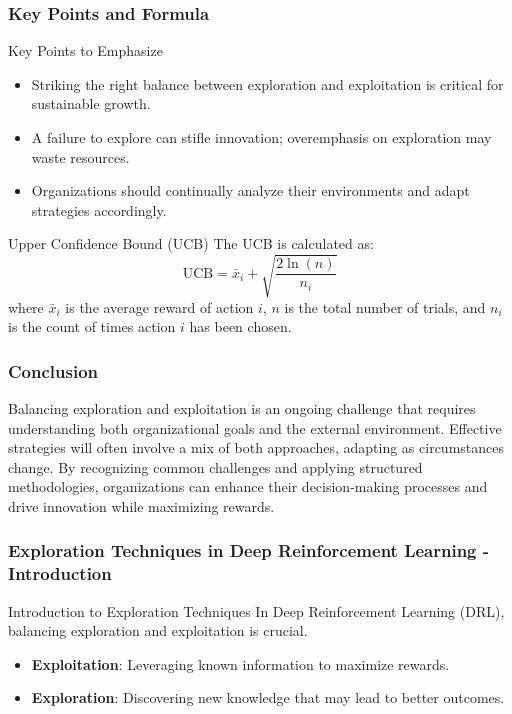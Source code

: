 \documentclass[aspectratio=169]{beamer}
\begin{document}
\begin{frame}[fragile]
    \frametitle{Key Points and Formula}
    \begin{block}{Key Points to Emphasize}
        \begin{itemize}
            \item Striking the right balance between exploration and exploitation is critical for sustainable growth.
            \item A failure to explore can stifle innovation; overemphasis on exploration may waste resources.
            \item Organizations should continually analyze their environments and adapt strategies accordingly.
        \end{itemize}
    \end{block}
    
    \begin{block}{Upper Confidence Bound (UCB)}
        The UCB is calculated as:
        \begin{equation}
            \text{UCB} = \bar{x}_i + \sqrt{\frac{2 \ln(n)}{n_i}}
        \end{equation}
        where \(\bar{x}_i\) is the average reward of action \(i\), \(n\) is the total number of trials, and \(n_i\) is the count of times action \(i\) has been chosen.
    \end{block}
\end{frame}

\begin{frame}[fragile]
    \frametitle{Conclusion}
    Balancing exploration and exploitation is an ongoing challenge that requires understanding both organizational goals and the external environment. Effective strategies will often involve a mix of both approaches, adapting as circumstances change. By recognizing common challenges and applying structured methodologies, organizations can enhance their decision-making processes and drive innovation while maximizing rewards.
\end{frame}

\begin{frame}[fragile]
    \frametitle{Exploration Techniques in Deep Reinforcement Learning - Introduction}
    \begin{block}{Introduction to Exploration Techniques}
        In Deep Reinforcement Learning (DRL), balancing exploration and exploitation is crucial. 
        \begin{itemize}
            \item \textbf{Exploitation}: Leveraging known information to maximize rewards.
            \item \textbf{Exploration}: Discovering new knowledge that may lead to better outcomes.
        \end{itemize}
    \end{block}
\end{frame}
\end{document}
